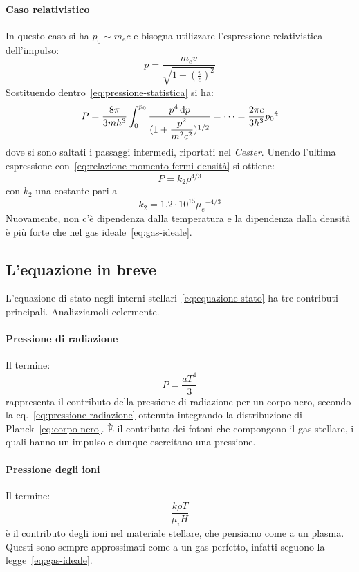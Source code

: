 \paragraph{Caso relativistico}
In questo caso si ha $p_0 \sim m_e c$ e bisogna utilizzare l'espressione relativistica dell'impulso:
\[
p= \dfrac{m_e v}{\sqrt{1- (\frac{v}{c})^2}}
\]
Sostituendo dentro~\eqref{eq:pressione-statistica} si ha:
\[
P = \dfrac{8\pi}{3mh^3} \int_0^{p_0} \dfrac{p^4 \mathop{}\!\mathrm{d} p}{(1 + \dfrac{p^2}{m^2c^2})^{1/2}} = \dots = \dfrac{2\pi c}{3h^3}{p_0}^4
\]
dove si sono saltati i passaggi intermedi, riportati nel \emph{Cester}. Unendo l'ultima espressione con~\eqref{eq:relazione-momento-fermi-densità} si ottiene:
\begin{equation}\label{eq:pressione-degenerazione-relativistica}
    P = k_2 \rho^{4/3}
\end{equation}
con $k_2$ una costante pari a
\[
k_2 = 1.2 \cdot 10^{15} {\mu_e}^{-4/3}
\]
Nuovamente, non c'è dipendenza dalla temperatura e la dipendenza dalla densità è più forte che nel gas ideale~\eqref{eq:gas-ideale}.

\subsection{L'equazione in breve}
L'equazione di stato negli interni stellari~\eqref{eq:equazione-stato} ha tre contributi principali. Analizziamoli celermente.

\paragraph{Pressione di radiazione}
Il termine:
\[
P = \dfrac{aT^4}{3}
\]
rappresenta il contributo della pressione di radiazione per un corpo nero, secondo la eq.~\eqref{eq:pressione-radiazione} ottenuta integrando la distribuzione di Planck~\ref{eq:corpo-nero}. È il contributo dei fotoni che compongono il gas stellare, i quali hanno un impulso e dunque esercitano una pressione.

\paragraph{Pressione degli ioni}
Il termine:
\[
\dfrac{k \rho T}{\mu_i H}
\]
è il contributo degli ioni nel materiale stellare, che pensiamo come a un plasma. Questi sono sempre approssimati come a un gas perfetto, infatti seguono la legge~\eqref{eq:gas-ideale}.

